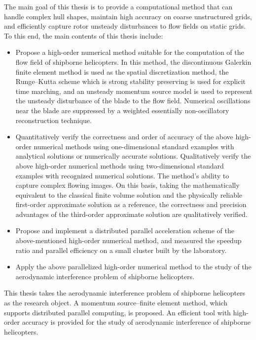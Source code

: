 \begin{eabstract}
The main goal of this thesis is to provide a computational method that can handle complex hull shapes, maintain high accuracy on coarse unstructured grids, and efficiently capture rotor unsteady disturbances to flow fields on static grids.
To this end, the main contents of this thesis include:
\begin{itemize}[wide]
\item Propose a high-order numerical method suitable for the computation of the flow field of shipborne helicopters. In this method, the discontinuous Galerkin finite element method is used as the spatial discretization method, the Runge--Kutta scheme which is strong stability preserving is used for explicit time marching, and an unsteady momentum source model is used to represent the unsteady disturbance of the blade to the flow field. Numerical oscillations near the blade are suppressed by a weighted essentially non-oscillatory reconstruction technique.
\item Quantitatively verify the correctness and order of accuracy of the above high-order numerical methods using one-dimensional standard examples with analytical solutions or numerically accurate solutions. Qualitatively verify the above high-order numerical methods using two-dimensional standard examples with recognized numerical solutions. The method's ability to capture complex flowing images. On this basis, taking the mathematically equivalent to the classical finite volume solution and the physically reliable first-order approximate solution as a reference, the correctness and precision advantages of the third-order approximate solution are qualitatively verified.
\item Propose and implement a distributed parallel acceleration scheme of the above-mentioned high-order numerical method, and measured the speedup ratio and parallel efficiency on a small cluster built by the laboratory.
\item Apply the above parallelized high-order numerical method to the study of the aerodynamic interference problem of shipborne helicopters.
\end{itemize}

This thesis takes the aerodynamic interference problem of shipborne helicopters as the research object.
A momentum source--finite element method, which supports distributed parallel computing, is proposed.
An efficient tool with high-order accuracy is provided for the study of aerodynamic interference of shipborne helicopters.
\end{eabstract}